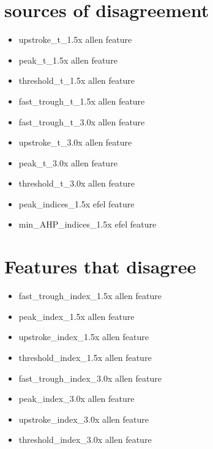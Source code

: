 \section{sources of disagreement}
\begin{itemize}
    \item upstroke\_t\_1.5x allen feature
    \item  peak\_t\_1.5x allen feature
    \item threshold\_t\_1.5x allen feature
    \item fast\_trough\_t\_1.5x allen feature
    \item fast\_trough\_t\_3.0x allen feature
    \item upstroke\_t\_3.0x allen feature
    \item peak\_t\_3.0x allen feature
    \item threshold\_t\_3.0x allen feature
    \item peak\_indices\_1.5x efel feature
    \item min\_AHP\_indices\_1.5x efel feature
\end{itemize}



\section{Features that disagree} 
\begin{itemize}

    \item fast\_trough\_index\_1.5x allen feature
    \item peak\_index\_1.5x allen feature
    \item upstroke\_index\_1.5x allen feature
    \item threshold\_index\_1.5x allen feature
    \item fast\_trough\_index\_3.0x allen feature
    \item peak\_index\_3.0x allen feature
    \item upstroke\_index\_3.0x allen feature
    \item threshold\_index\_3.0x allen feature
\end{itemize}


